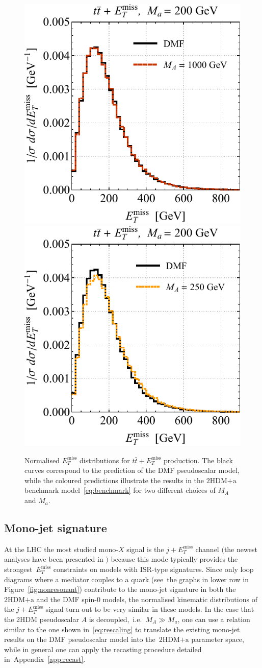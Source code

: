 \documentclass[a4paper, 11pt,notoc]{article}
\newcommand{\MET}{\ensuremath{E_T^\mathrm{miss}}\xspace}
\newcommand{\mA}{\ensuremath{M_{A}}\xspace}
\newcommand{\ma}{\ensuremath{M_{a}}\xspace}
\newcommand{\hdma}{\ensuremath{\textrm{2HDM+a}}\xspace}
\begin{document}
\begin{figure}[t!]
\centering
\includegraphics[height=0.45\textwidth]{ttmetl.pdf} \qquad 
\includegraphics[height=0.45\textwidth]{ttmetr.pdf}
\vspace{2mm}
\caption{\label{fig:ttmet} Normalised $\MET$ distributions for $t \bar t + \MET$ production. The black curves correspond to the prediction of the DMF pseudoscalar   model, while the coloured predictions illustrate the results in the \hdma benchmark model~\eqref{eq:benchmark} for two different choices of $\mA$ and $\ma$.} 
\end{figure}

\subsection*{Mono-jet signature}

At the LHC the most studied mono-$X$ signal is the $j +\MET$ channel $\big($the newest analyses have been presented in \cite{Aaboud:2017phn,Sirunyan:2017jix}$\big)$ because this mode typically provides the strongest~$\MET$ constraints on models with ISR-type  signatures. Since only loop diagrams where a mediator couples to a quark (see~the graphs in lower row in Figure~\ref{fig:nonresonant}) contribute to the mono-jet signature in both the \hdma and the DMF spin-0 models, the normalised kinematic distributions of the $j +\MET$ signal turn out to be very similar in these models.  In the case that the 2HDM pseudoscalar $A$ is decoupled,~i.e.~$\mA \gg \ma$, one can use a relation similar to the one shown in~\eqref{eq:rescaling} to translate the existing mono-jet results on the DMF pseudoscalar model into the~\hdma parameter space, while in general one can apply the recasting procedure detailed in~Appendix~\ref{app:recast}.
\end{document}

